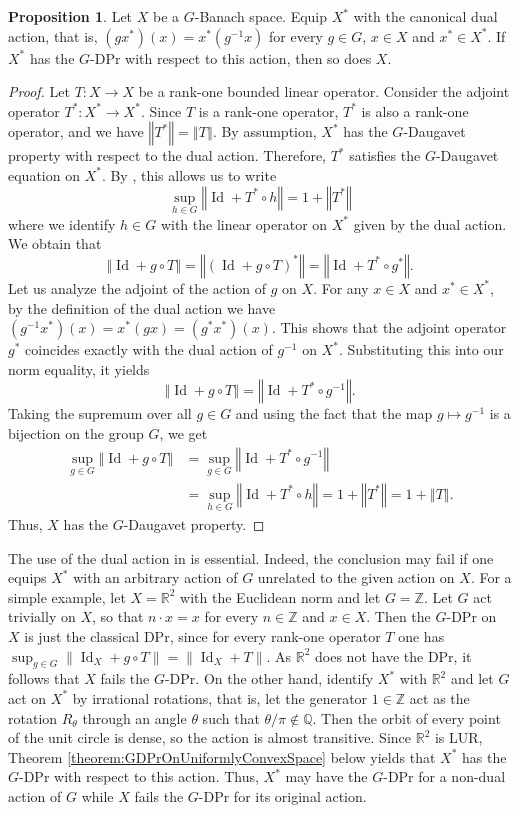 \documentclass[a4paper,12pt]{amsart}
\theoremstyle{definition}
\newtheorem{proposition}[theorem]{Proposition}
\theoremstyle{definition}
\theoremstyle{remark}
\numberwithin{equation}{section}
\newcommand{\R}{\mathbb{R}}
\newcommand{\Z}{\mathbb{Z}}
\DeclareMathOperator{\id}{Id}
\newcommand{\<}{\langle}
\renewcommand{\>}{\rangle}
\newcommand{\norm}[1]{\left\Vert#1\right\Vert}
\begin{document}
	
	\begin{proposition} \label{prop:inheritanceFromDual}
		Let $X$ be a $G$-Banach space. Equip $X^*$ with the canonical dual action, that is, $(gx^*)(x) = x^*(g^{-1}x)$ for every $g \in G$, $x \in X$ and $x^* \in X^*$. If $X^*$ has the $G$-DPr with respect to this action, then so does $X$.
	\end{proposition}
	\begin{proof}
		Let $T:X \to X$ be a rank-one bounded linear operator. Consider the adjoint operator $T^*: X^* \to X^*$. Since $T$ is a rank-one operator, $T^*$ is also a rank-one operator, and we have $\norm{T^*} = \norm{T}$.
		By assumption, $X^*$ has the $G$-Daugavet property with respect to the dual action. Therefore, $T^*$ satisfies the $G$-Daugavet equation on $X^*$. By , this allows us to write
		$$
		\sup_{h \in G} \norm{\id + T^* \circ h} = 1 + \norm{T^*}
		$$
		where we identify $h \in G$ with the linear operator on $X^*$ given by the dual action. We obtain that
		$$
		\norm{\id + g \circ T} = \norm{(\id + g \circ T)^*} = \norm{\id + T^* \circ g^*}.
		$$
		Let us analyze the adjoint of the action of $g$ on $X$. For any $x \in X$ and $x^* \in X^*$, by the definition of the dual action we have $(g^{-1}x^*)(x) = x^*(g x) = (g^* x^*)(x)$. This shows that the adjoint operator $g^*$ coincides exactly with the dual action of $g^{-1}$ on $X^*$. Substituting this into our norm equality, it yields
		$$
		\norm{\id + g \circ T} = \norm{\id + T^* \circ g^{-1}}.
		$$
		Taking the supremum over all $g \in G$ and using the fact that the map $g \mapsto g^{-1}$ is a bijection on the group $G$, we get
		$$
		\begin{aligned}
			\sup_{g \in G} \norm{\id + g \circ T} &= \sup_{g \in G} \norm{\id + T^* \circ g^{-1}} \\
			&= \sup_{h \in G} \norm{\id + T^* \circ h} 
			= 1 + \norm{T^*} 
			= 1 + \norm{T}.
		\end{aligned}
		$$
		Thus, $X$ has the $G$-Daugavet property.
	\end{proof}
	
	The use of the dual action in  is essential. Indeed, the conclusion may fail if one equips $X^*$ with an arbitrary action of $G$ unrelated to the given action on $X$. For a simple example, let $X=\R^2$ with the Euclidean norm and let $G=\Z$. Let $G$ act trivially on $X$, so that $n\cdot x=x$ for every $n\in\Z$ and $x\in X$. Then the $G$-DPr on $X$ is just the classical DPr, since for every rank-one operator $T$ one has $\sup_{g\in G}\|\id_X+g\circ T\|=\|\id_X+T\|$. As $\R^2$ does not have the DPr, it follows that $X$ fails the $G$-DPr. On the other hand, identify $X^*$ with $\R^2$ and let $G$ act on $X^*$ by irrational rotations, that is, let the generator $1\in\Z$ act as the rotation $R_\theta$ through an angle $\theta$ such that $\theta/\pi\notin\mathbb Q$. Then the orbit of every point of the unit circle is dense, so the action is almost transitive. Since $\R^2$ is LUR, Theorem \ref{theorem:GDPrOnUniformlyConvexSpace} below yields that $X^*$ has the $G$-DPr with respect to this action. Thus, $X^*$ may have the $G$-DPr for a non-dual action of $G$ while $X$ fails the $G$-DPr for its original action.
	
\end{document}
